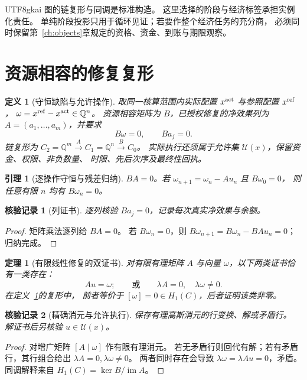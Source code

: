 \documentclass[12pt,a4paper,openany]{report}
\newtheorem{definition}{定义}[chapter]
\newtheorem{theorem}{定理}[chapter]
\newtheorem{lemma}{引理}[chapter]
\newtheorem{Certificate}{核验记录}[chapter]
\newcommand{\QQ}{\mathbb Q}
\newcommand{\im}{\operatorname{im}}
\begin{document}
\begin{CJK*}{UTF8}{gkai}
图的链复形与同调是标准构造\cite{Hatcher}。
这里选择的阶段与经济标签承担实例化责任。
单纯阶段投影只用于循环见证；若要作整个经济任务的充分商，
必须同时保留第~\ref{ch:objects}章规定的资格、资金、到账与期限观察。

\section{资源相容的修复复形}
\begin{definition}[守恒缺陷与允许操作]
\label{def:repair}
取同一核算范围内实际配置 \(x^{\rm act}\) 与参照配置 \(x^{\rm ref}\)，
\(\omega=x^{\rm ref}-x^{\rm act}\in\QQ^n\)。
资源相容矩阵为 \(B\)，已授权修复的净效果列为
\(A=(a_1,\ldots,a_m)\)，并要求
\[
B\omega=0,\qquad Ba_j=0.
\]
链复形为 \(C_2=\QQ^m\xrightarrow{A}C_1=\QQ^n\xrightarrow{B}C_0\)。
实际执行还须属于允许集 \(\mathcal U(x)\)，保留资金、权限、非负数量、
时限、先后次序及最终性回执。
\end{definition}

\begin{lemma}[逐操作守恒与残差归纳]
\label{lem:balance}
\(BA=0\)。若 \(\omega_{n+1}=\omega_n-Au_n\) 且 \(B\omega_0=0\)，
则任意有限 \(n\) 均有 \(B\omega_n=0\)。
\end{lemma}
\begin{Certificate}[列证书]
逐列核验 \(Ba_j=0\)，记录每次真实净效果与余额。
\end{Certificate}
\begin{proof}
矩阵乘法逐列给 \(BA=0\)。
若 \(B\omega_n=0\)，则
\(B\omega_{n+1}=B\omega_n-BAu_n=0\)；归纳完成。
\end{proof}

\begin{theorem}[有限线性修复的双证书]
\label{thm:dual}
对有限有理矩阵 \(A\) 与向量 \(\omega\)，以下两类证书恰有一类存在：
\[
Au=\omega;
\qquad\text{或}\qquad
\lambda A=0,\quad\lambda\omega\ne0.
\]
在定义~\ref{def:repair}的复形中，
前者等价于 \([\omega]=0\in H_1(C)\)，后者证明该类非零。
\end{theorem}
\begin{Certificate}[精确消元与允许执行]
保存有理高斯消元的行变换、解或矛盾行。
解证书后另核验 \(u\in\mathcal U(x)\)。
\end{Certificate}
\begin{proof}
对增广矩阵 \([A\mid\omega]\) 作有限有理消元。
若无矛盾行则回代有解；若有矛盾行，其行组合给出
\(\lambda A=0,\lambda\omega\ne0\)。
两者同时存在会导致
\(\lambda\omega=\lambda Au=0\)，矛盾。
同调解释来自 \(H_1(C)=\ker B/\im A\)。
\end{proof}


\end{CJK*}
\end{document}
